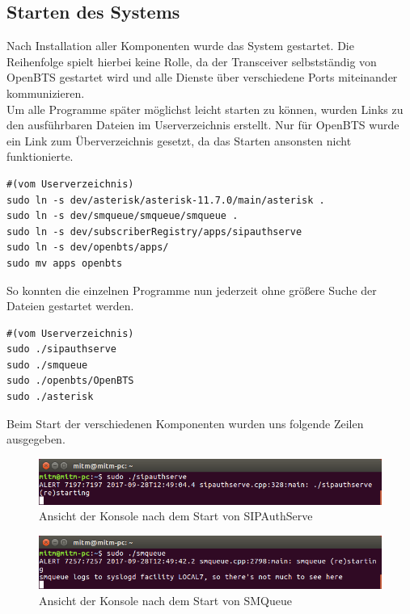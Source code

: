 \subsection{Starten des Systems}
Nach Installation aller Komponenten wurde das System gestartet. Die Reihenfolge spielt hierbei keine Rolle, da der Transceiver selbstständig von OpenBTS gestartet wird und alle Dienste über verschiedene Ports miteinander kommunizieren.\\
Um alle Programme später möglichst leicht starten zu können, wurden Links zu den ausführbaren Dateien im Userverzeichnis erstellt. Nur für OpenBTS wurde ein Link zum Überverzeichnis gesetzt, da das Starten ansonsten nicht funktionierte.
\begin{lstlisting}
#(vom Userverzeichnis)
sudo ln -s dev/asterisk/asterisk-11.7.0/main/asterisk .
sudo ln -s dev/smqueue/smqueue/smqueue .
sudo ln -s dev/subscriberRegistry/apps/sipauthserve
sudo ln -s dev/openbts/apps/
sudo mv apps openbts
\end{lstlisting}

So konnten die einzelnen Programme nun jederzeit ohne größere Suche der Dateien gestartet werden.
\begin{lstlisting}
#(vom Userverzeichnis)
sudo ./sipauthserve
sudo ./smqueue
sudo ./openbts/OpenBTS
sudo ./asterisk
\end{lstlisting}

Beim Start der verschiedenen Komponenten wurden uns folgende Zeilen ausgegeben.\\
\begin{figure}[htbp]
	\centering
		\includegraphics[width=1.00\textwidth]{includes/Start_sipauthserve}
	\caption{Ansicht der Konsole nach dem Start von SIPAuthServe}
	\label{fig:start_sipauthserve}
\end{figure}

\begin{figure}[htbp]
	\centering
		\includegraphics[width=1.00\textwidth]{includes/Start_smqueue}
	\caption{Ansicht der Konsole nach dem Start von SMQueue}
	\label{fig:start_smqueue}
\end{figure}

